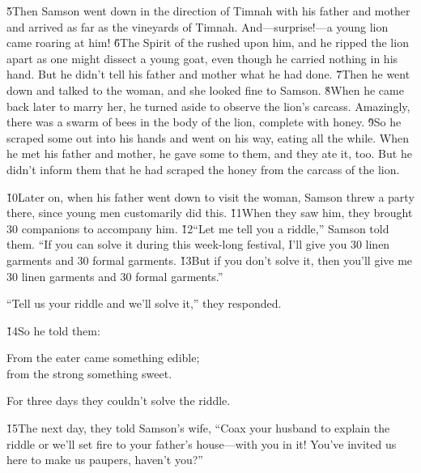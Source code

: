 \v{5}Then Samson went down in the direction of Timnah with his father and mother and arrived as far as the vineyards of Timnah. And---surprise!---a young lion came roaring at him! \v{6}The Spirit of the  rushed upon him, and he ripped the lion apart as one might dissect a young goat, even though he carried nothing in his hand. But he didn't tell his father and mother what he had done. \v{7}Then he went down and talked to the woman, and she looked fine to Samson. \v{8}When he came back later to marry her, he turned aside to observe the lion's carcass. Amazingly, there was a swarm of bees in the body of the lion, complete with honey. \v{9}So he scraped some out into his hands and went on his way, eating all the while. When he met his father and mother, he gave some to them, and they ate it, too. But he didn't inform them that he had scraped the honey from the carcass of the lion.

\v{10}Later on, when his father went down to visit the woman, Samson threw a party there, since young men customarily did this. \v{11}When they saw him, they brought 30 companions to accompany him. \v{12}``Let me tell you a riddle,'' Samson told them. ``If you can solve it during this week-long festival, I'll give you 30 linen garments and 30 formal garments. \v{13}But if you don't solve it, then you'll give me 30 linen garments and 30 formal garments.''

``Tell us your riddle and we'll solve it,'' they responded.

\v{14}So he told them:

\begin{poetry}
\poeml From the eater came something edible; \\
\poemll    from the strong something sweet.
\end{poetry}

For three days they couldn't solve the riddle.

\v{15}The next day, they told Samson's wife, ``Coax your husband to explain the riddle or we'll set fire to your father's house---with you in it! You've invited us here to make us paupers, haven't you?''


